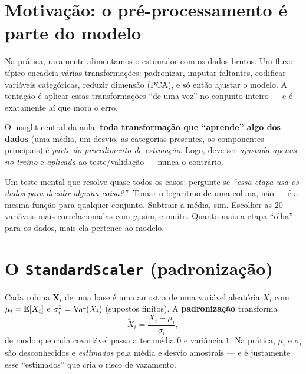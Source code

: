 \documentclass[11pt,a4paper]{article}
\begin{document}
\section{Motivação: o pré-processamento é parte do modelo}
Na prática, raramente alimentamos o estimador com os dados brutos. Um fluxo típico
encadeia várias transformações: padronizar, imputar faltantes, codificar variáveis
categóricas, reduzir dimensão (PCA), e só então ajustar o modelo. A tentação é
aplicar essas transformações ``de uma vez'' no conjunto inteiro --- e é exatamente aí
que mora o erro.

\begin{ideia}
O insight central da aula: \textbf{toda transformação que ``aprende'' algo dos
dados} (uma média, um desvio, as categorias presentes, os componentes principais)
é \emph{parte do procedimento de estimação}. Logo, deve ser \emph{ajustada apenas
no treino} e \emph{aplicada} ao teste/validação --- nunca o contrário.
\end{ideia}

\noindent
Um teste mental que resolve quase todos os casos: pergunte-se \emph{``essa etapa
usa os dados para decidir alguma coisa?''}. Tomar o logaritmo de uma coluna,
não --- é a mesma função para qualquer conjunto. Subtrair a média, sim. Escolher
as 20 variáveis mais correlacionadas com $y$, sim, e muito. Quanto mais a etapa
``olha'' para os dados, mais ela pertence ao modelo.

\section{O \texttt{StandardScaler} (padronização)}
Cada coluna $\bm{X}_i$ de uma base é uma amostra de uma variável aleatória $X_i$ com
$\mu_i=\mathbb{E}[X_i]$ e $\sigma_i^2=\operatorname{Var}(X_i)$ (supostos finitos). A \textbf{padronização}
transforma
\begin{equation}\label{eq:std}
  \widetilde{X}_i = \frac{X_i - \mu_i}{\sigma_i},
\end{equation}
de modo que cada covariável passa a ter média $0$ e variância $1$. Na prática,
$\mu_i$ e $\sigma_i$ são desconhecidos e \emph{estimados} pela média e desvio
amostrais --- e é justamente esse ``estimados'' que cria o risco de vazamento.
\end{document}
